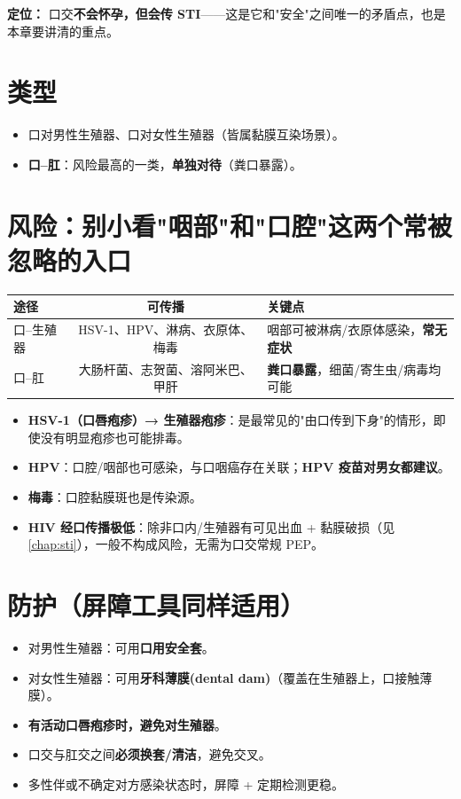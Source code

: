 \documentclass[12pt,UTF8,openany]{ctexbook}
\begin{document}
\noindent\textbf{定位：} 口交\textbf{不会怀孕，但会传 STI}——这是它和"安全"之间唯一的矛盾点，也是本章要讲清的重点。

\section{类型}

\begin{itemize}[leftmargin=2em,itemsep=0.3em]
  \item 口对男性生殖器、口对女性生殖器（皆属黏膜互染场景）。
  \item \textbf{口--肛}：风险最高的一类，\textbf{单独对待}（粪口暴露）。
\end{itemize}

\section{风险：别小看"咽部"和"口腔"这两个常被忽略的入口}

\begin{tabularx}{\textwidth}{lC X}
\toprule
途径 & 可传播 & 关键点 \\
\midrule
口--生殖器 & HSV-1、HPV、淋病、衣原体、梅毒 & 咽部可被淋病/衣原体感染，\textbf{常无症状} \\
口--肛 & 大肠杆菌、志贺菌、溶阿米巴、甲肝 & \textbf{粪口暴露}，细菌/寄生虫/病毒均可能 \\
\bottomrule
\end{tabularx}

\vspace{0.5em}
\begin{itemize}[leftmargin=2em,itemsep=0.3em]
  \item \textbf{HSV-1（口唇疱疹）→ 生殖器疱疹}：是最常见的"由口传到下身"的情形，即使没有明显疱疹也可能排毒。
  \item \textbf{HPV}：口腔/咽部也可感染，与口咽癌存在关联；\textbf{HPV 疫苗对男女都建议}。
  \item \textbf{梅毒}：口腔黏膜斑也是传染源。
  \item \textbf{HIV 经口传播极低}：除非口内/生殖器有可见出血 + 黏膜破损（见\ref{chap:sti}），一般不构成风险，无需为口交常规 PEP。
\end{itemize}

\section{防护（屏障工具同样适用）}

\begin{itemize}[leftmargin=2em,itemsep=0.3em]
  \item 对男性生殖器：可用\textbf{口用安全套}。
  \item 对女性生殖器：可用\textbf{牙科薄膜(dental dam)}（覆盖在生殖器上，口接触薄膜）。
  \item \textbf{有活动口唇疱疹时，避免对生殖器}。
  \item 口交与肛交之间\textbf{必须换套/清洁}，避免交叉。
  \item 多性伴或不确定对方感染状态时，屏障 + 定期检测更稳。
\end{itemize}
\end{document}
